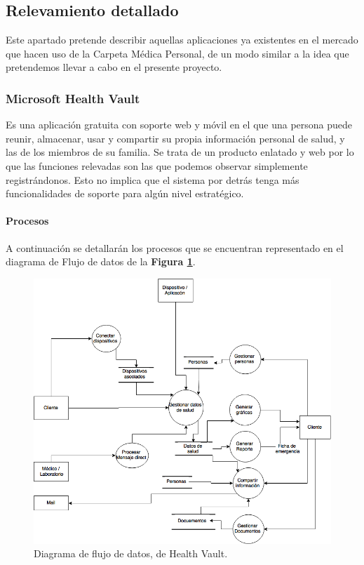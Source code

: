 \clearpage
\subsection{Relevamiento detallado}
Este apartado pretende describir aquellas aplicaciones ya existentes en el mercado que hacen uso de la Carpeta Médica Personal, de un modo similar a la idea que pretendemos llevar a cabo en el presente proyecto.


\subsubsection{Microsoft Health Vault}
	 Es una aplicación gratuita con soporte web y móvil en el que una persona puede reunir, almacenar, usar y compartir su propia información personal de salud, y las de los miembros de su familia. Se trata de un producto enlatado y web por lo que las funciones relevadas son las que podemos observar simplemente registrándonos.
     Esto no implica que el sistema por detrás tenga más funcionalidades de soporte para algún nivel estratégico.
	
\paragraph{Procesos}


A continuación se detallarán los procesos que se encuentran representado en el diagrama de Flujo de datos de la \textbf{Figura \ref{hv_data_flow}}.

	\begin{figure}[h]
      \centering
      \includegraphics[width=.8\textwidth]{img/tp1/hv_flujo_de_datos}
      \caption{Diagrama de flujo de datos, de Health Vault.}
      \label{hv_data_flow}
    \end{figure} 


